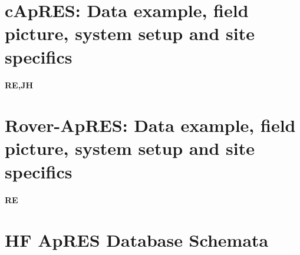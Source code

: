 \documentclass[a4paper,12pt]{article}
\renewcommand{\arraystretch}{1.5}
\newcommand{\ProtocolTable}[6]
{
\begin{table}[]
\begin{tabular}{|p{1.8cm} p{3.8cm} p{1.8cm} p{2.0cm}|}
\hline
 \rowcolor{beaublue}\textbf{Name}:&\multicolumn{3}{l}{#1} \\
 \rowcolor{beaublue}\textbf{Folder:}&\multicolumn{3}{l}{#2} \\
 \rowcolor{beaublue}\textbf{Instrument:}&#3&\textbf{Date:}&#4 \\
  \rowcolor{beaublue}\textbf{Operator:}&#5&\textbf{Location:}&#6\\
\hline
\end{tabular}
\end{table}
}
\begin{document}
\pagebreak
\section{cApRES: Data example, field picture, system setup and site specifics}
\label{SeccApRES}
\textbf{RE,JH}


\pagebreak
\section{Rover-ApRES: Data example, field picture, system setup and site specifics}
\label{SecRoverApRES}
\textbf{RE}


%


\clearpage
\appendix
\section{HF ApRES Database Schemata}
\label{AppendixHFApRESDatabaseSchemata}

\newcommand{\sqlspectable}[2]{
    \renewcommand{\arraystretch}{1.5}
    \rowcolors{2}{gray!10}{white}
    \begin{longtable}{l l >{\raggedright}p{3cm} >{\raggedright\arraybackslash}p{4cm}}
        \caption{#2} \\
        \hline
        \rowcolor{gray!50}
        \textbf{Fieldname} & \textbf{Datatype} & \textbf{Parameters} & \textbf{Description}\\
        \hline
        \endhead
        \hline
        \endfoot
        #1
    \end{longtable}
}
\end{document}
